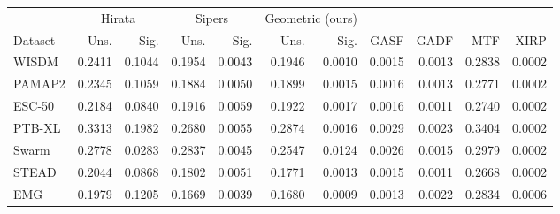 \begin{tabular}{@{}lrrrrrrrrrr@{}}
\toprule
& \multicolumn{2}{c}{Hirata} & \multicolumn{2}{c}{Sipers} & \multicolumn{2}{c}{Geometric (ours)} & & & & \\
\cmidrule(lr){2-3}\cmidrule(lr){4-5}\cmidrule(lr){6-7}
Dataset & Uns. & Sig. & Uns. & Sig. & Uns. & Sig. & GASF & GADF & MTF & XIRP \\
\midrule
WISDM & 0.2411 & 0.1044 & 0.1954 & 0.0043 & 0.1946 & 0.0010 & 0.0015 & 0.0013 & 0.2838 & 0.0002 \\
PAMAP2 & 0.2345 & 0.1059 & 0.1884 & 0.0050 & 0.1899 & 0.0015 & 0.0016 & 0.0013 & 0.2771 & 0.0002 \\
ESC-50 & 0.2184 & 0.0840 & 0.1916 & 0.0059 & 0.1922 & 0.0017 & 0.0016 & 0.0011 & 0.2740 & 0.0002 \\
PTB-XL & 0.3313 & 0.1982 & 0.2680 & 0.0055 & 0.2874 & 0.0016 & 0.0029 & 0.0023 & 0.3404 & 0.0002 \\
Swarm & 0.2778 & 0.0283 & 0.2837 & 0.0045 & 0.2547 & 0.0124 & 0.0026 & 0.0015 & 0.2979 & 0.0002 \\
STEAD & 0.2044 & 0.0868 & 0.1802 & 0.0051 & 0.1771 & 0.0013 & 0.0015 & 0.0011 & 0.2668 & 0.0002 \\
EMG & 0.1979 & 0.1205 & 0.1669 & 0.0039 & 0.1680 & 0.0009 & 0.0013 & 0.0022 & 0.2834 & 0.0006 \\
\bottomrule
\end{tabular}
